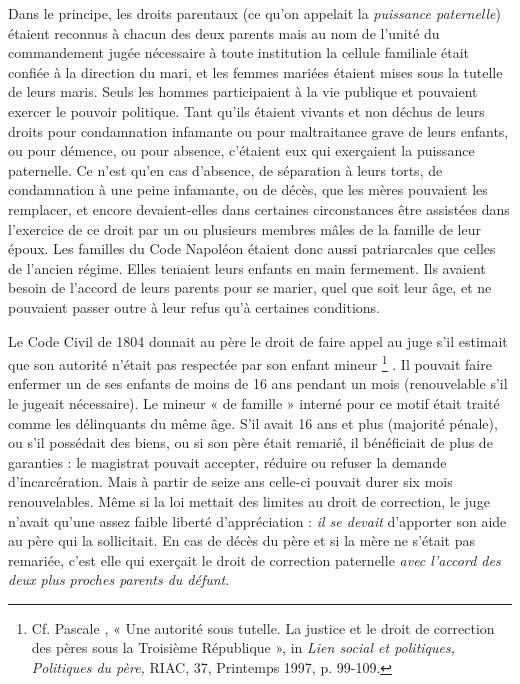  Dans le principe, les droits parentaux (ce qu'on appelait la \emph{puissance paternelle}) étaient reconnus à chacun des deux parents mais au nom de l'unité du commandement jugée nécessaire à toute institution la cellule familiale était confiée à la direction du mari, et les femmes mariées étaient mises sous la tutelle de leurs maris. Seuls les hommes participaient à la vie publique et pouvaient exercer le pouvoir politique. Tant qu'ils étaient vivants et non déchus de leurs droits pour condamnation infamante ou pour maltraitance grave de leurs enfants, ou pour démence, ou pour absence, c'étaient eux qui exerçaient la puissance paternelle. Ce n'est qu'en cas d'absence, de séparation à leurs torts, de condamnation à une peine infamante, ou de décès, que les mères pouvaient les remplacer, et encore devaient-elles dans certaines circonstances être assistées dans l'exercice de ce droit par un ou plusieurs membres mâles de la famille de leur époux. Les familles du Code Napoléon étaient donc aussi patriarcales que celles de l'ancien régime. Elles tenaient leurs enfants en main fermement. Ils avaient besoin de l'accord de leurs parents pour se marier, quel que soit leur âge, et ne pouvaient passer outre à leur refus qu'à certaines conditions. 

 Le Code Civil de 1804 donnait au père le droit de faire appel au juge s'il estimait que son autorité n'était pas respectée par son enfant mineur%
\footnote{Cf. Pascale , « Une autorité sous tutelle. La justice et le droit de correction des pères sous la Troisième République », in \emph{Lien social et politiques, Politiques du père,} RIAC, 37, Printemps 1997, p. 99-109.}%
. Il pouvait faire enfermer un de ses enfants de moins de 16 ans pendant un mois (renouvelable s'il le jugeait nécessaire). Le mineur « de famille » interné pour ce motif était traité comme les délinquants du même âge. S'il avait 16 ans et plus (majorité pénale), ou s'il possédait des biens, ou si son père était remarié, il bénéficiait de plus de garanties : le magistrat pouvait accepter, réduire ou refuser la demande d'incarcération. Mais à partir de seize ans celle-ci pouvait durer six mois renouvelables. Même si la loi mettait des limites au droit de correction, le juge n'avait qu'une assez faible liberté d'appréciation : \emph{il se devait} d'apporter son aide au père qui la sollicitait. En cas de décès du père et si la mère ne s'était pas remariée, c'est elle qui exerçait le droit de correction paternelle \emph{avec l'accord des deux plus proches parents du défunt}. 

